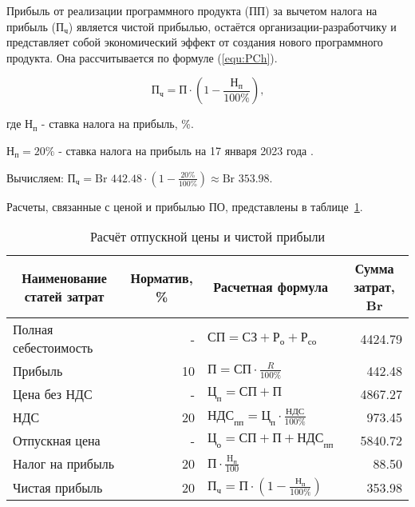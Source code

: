 Прибыль от реализации программного продукта (ПП) за вычетом налога на прибыль ($\text{П}_\text{ч}$)
является чистой прибылью,
остаётся организации-разработчику
и представляет собой экономический эффект от создания нового программного продукта.
Она рассчитывается по формуле (\ref{equ:PCh}).

\begin{equation}
    \label{equ:PCh}
    \text{П}_\text{ч} = \text{П} \cdot ( 1 - \frac{ \text{Н}_\text{п} }{ 100\% }) \text{,}
\end{equation}

где $\text{Н}_\text{п}$ - ставка налога на прибыль, \%.

$\text{Н}_\text{п} = 20\%$ - ставка налога на прибыль на 17 января 2023 года \cite{economicStavkaNalogaNaPripil}.

Вычисляем: $\text{П}_\text{ч} = \text{Br } 442.48 \cdot ( 1 - \frac{ 20\% }{ 100\% }) \approx \text{Br } 353.98$.

Расчеты, связанные с ценой и прибылью ПО, представлены в таблице~\ref{tab:RaschetOtpusknoiCeniIChistoiPribiliPO}.

\begin{table}[ht]
    \centering\small

    \caption{Расчёт отпускной цены и чистой прибыли}
    \label{tab:RaschetOtpusknoiCeniIChistoiPribiliPO}

    \begin{tabular}{|l|r|l|r|}
        \hline
        \multicolumn{1}{|c|}{Наименование статей затрат}
        & \multicolumn{1}{c|}{Норматив, \%}
        & \multicolumn{1}{c|}{Расчетная формула}
        & \multicolumn{1}{c|}{Сумма затрат, Br}
        \\ \hline

        Полная себестоимость& -     & $\text{СП} = \text{СЗ} + \text{Р}_\text{о} + \text{Р}_\text{со}$                  & 4424.79   \\ \hline
        Прибыль             & 10    & $\text{П} = \text{СП} \cdot \frac{ R }{ 100\% }$                                  & 442.48    \\ \hline
        Цена без НДС        & -     & $\text{Ц}_\text{п} = \text{СП} + \text{П}$                                        & 4867.27   \\ \hline
        НДС                 & 20    & $\text{НДС}_\text{пп} = \text{Ц}_\text{п} \cdot \frac{ \text{НДС} }{ 100\% }$     & 973.45    \\ \hline
        Отпускная цена      & -     & $\text{Ц}_\text{о} = \text{СП} + \text{П} + \text{НДС}_\text{пп}$                 & 5840.72   \\ \hline
        Налог на прибыль    & 20    & $\text{П} \cdot \frac{\text{H}_\text{п} }{ 100 }$                                 & 88.50     \\ \hline
        Чистая прибыль      & 20    & $\text{П}_\text{ч} = \text{П} \cdot ( 1 - \frac{ \text{Н}_\text{п} }{ 100\% })$   & 353.98    \\ \hline
    \end{tabular}
\end{table}

